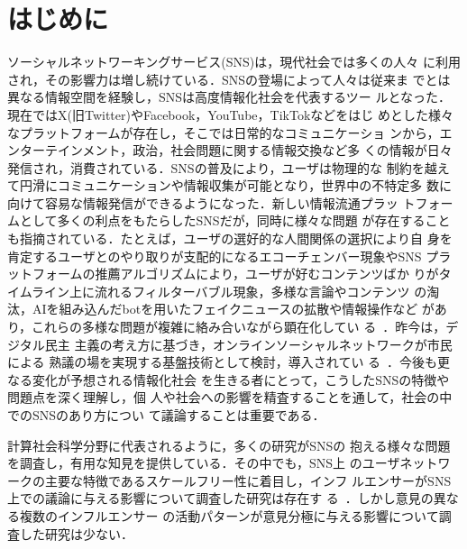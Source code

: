 \documentclass[a4j]{ujarticle}
\begin{document}
\maketitle
\thispagestyle{empty}


\section{はじめに}\label{Intro}
ソーシャルネットワーキングサービス(SNS)は，現代社会では多くの人々
に利用され，その影響力は増し続けている．SNSの登場によって人々は従来ま
でとは異なる情報空間を経験し，SNSは高度情報化社会を代表するツー
ルとなった．現在ではX(旧Twitter)やFacebook，YouTube，TikTokなどをはじ
めとした様々なプラットフォームが存在し，そこでは日常的なコミュニケーショ
ンから，エンターテインメント，政治，社会問題に関する情報交換など多
くの情報が日々発信され，消費されている．SNSの普及により，ユーザは物理的な
制約を越えて円滑にコミュニケーションや情報収集が可能となり，世界中の不特定多
数に向けて容易な情報発信ができるようになった．新しい情報流通プラッ
トフォームとして多くの利点をもたらしたSNSだが，同時に様々な問題
が存在することも指摘されている．たとえば，ユーザの選好的な人間関係の選択により自
身を肯定するユーザとのやり取りが支配的になるエコーチェンバー現象やSNS
プラットフォームの推薦アルゴリズムにより，ユーザが好むコンテンツばか
りがタイムライン上に流れるフィルターバブル現象，多様な言論やコンテンツ
の淘汰，AIを組み込んだbotを用いたフェイクニュースの拡散や情報操作など
があり，これらの多様な問題が複雑に絡み合いながら顕在化してい
る~\cite{Fisher2015,Baccarella2018,Conover2021}．昨今は，デジタル民主
主義の考え方に基づき，オンラインソーシャルネットワークが市民による
熟議の場を実現する基盤技術として検討，導入されてい
る~\cite{Smith2021,Tseng2022}．今後も更なる変化が予想される情報化社会
を生きる者にとって，こうしたSNSの特徴や問題点を深く理解し，個
人や社会への影響を精査することを通して，社会の中でのSNSのあり方につい
て議論することは重要である．
\par


計算社会科学\cite{Lazer2009}分野に代表されるように，多くの研究がSNSの
抱える様々な問題を調査し，有用な知見を提供している．その中でも，SNS上
のユーザネットワークの主要な特徴であるスケールフリー性に着目し，インフ
ルエンサーがSNS上での議論に与える影響について調査した研究は存在す
る~\cite{Betts2023,Helfmann2023}．しかし意見の異なる複数のインフルエンサー
の活動パターンが意見分極に与える影響について調査した研究は少ない．
\par
\end{document}
